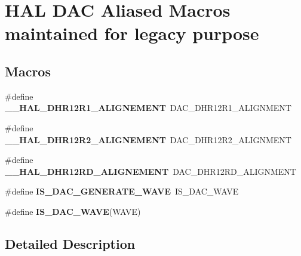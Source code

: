 \hypertarget{group___h_a_l___d_a_c___aliased___macros}{}\section{H\+AL D\+AC Aliased Macros maintained for legacy purpose}
\label{group___h_a_l___d_a_c___aliased___macros}
\subsection*{Macros}
\begin{DoxyCompactItemize}
\item 
\#define {\bfseries \+\_\+\+\_\+\+H\+A\+L\+\_\+\+D\+H\+R12\+R1\+\_\+\+A\+L\+I\+G\+N\+E\+M\+E\+NT}~D\+A\+C\+\_\+\+D\+H\+R12\+R1\+\_\+\+A\+L\+I\+G\+N\+M\+E\+NT\hypertarget{group___h_a_l___d_a_c___aliased___macros_ga354fd3b8705eea7292d4e4169497da60}{}\label{group___h_a_l___d_a_c___aliased___macros_ga354fd3b8705eea7292d4e4169497da60}

\item 
\#define {\bfseries \+\_\+\+\_\+\+H\+A\+L\+\_\+\+D\+H\+R12\+R2\+\_\+\+A\+L\+I\+G\+N\+E\+M\+E\+NT}~D\+A\+C\+\_\+\+D\+H\+R12\+R2\+\_\+\+A\+L\+I\+G\+N\+M\+E\+NT\hypertarget{group___h_a_l___d_a_c___aliased___macros_ga2201f928be872705c094e047e49c4b82}{}\label{group___h_a_l___d_a_c___aliased___macros_ga2201f928be872705c094e047e49c4b82}

\item 
\#define {\bfseries \+\_\+\+\_\+\+H\+A\+L\+\_\+\+D\+H\+R12\+R\+D\+\_\+\+A\+L\+I\+G\+N\+E\+M\+E\+NT}~D\+A\+C\+\_\+\+D\+H\+R12\+R\+D\+\_\+\+A\+L\+I\+G\+N\+M\+E\+NT\hypertarget{group___h_a_l___d_a_c___aliased___macros_ga32958593af3de40d27a9944ab91a7255}{}\label{group___h_a_l___d_a_c___aliased___macros_ga32958593af3de40d27a9944ab91a7255}

\item 
\#define {\bfseries I\+S\+\_\+\+D\+A\+C\+\_\+\+G\+E\+N\+E\+R\+A\+T\+E\+\_\+\+W\+A\+VE}~I\+S\+\_\+\+D\+A\+C\+\_\+\+W\+A\+VE\hypertarget{group___h_a_l___d_a_c___aliased___macros_ga71522f902db10a227650387b90a0ae45}{}\label{group___h_a_l___d_a_c___aliased___macros_ga71522f902db10a227650387b90a0ae45}

\item 
\#define {\bfseries I\+S\+\_\+\+D\+A\+C\+\_\+\+W\+A\+VE}(W\+A\+VE)
\end{DoxyCompactItemize}


\subsection{Detailed Description}


